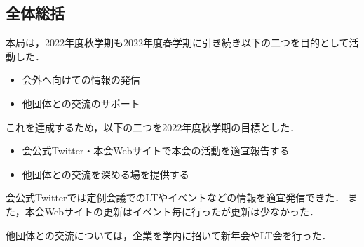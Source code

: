 \subsection*{全体総括}


本局は，2022年度秋学期も2022年度春学期に引き続き以下の二つを目的として活動した．
\begin{itemize}
    \item 会外へ向けての情報の発信
    \item 他団体との交流のサポート
\end{itemize}
これを達成するため，以下の二つを2022年度秋学期の目標とした．
\begin{itemize}
    \item 会公式Twitter・本会Webサイトで本会の活動を適宜報告する
    \item 他団体との交流を深める場を提供する
\end{itemize}

会公式Twitterでは定例会議でのLTやイベントなどの情報を適宜発信できた．
また，本会Webサイトの更新はイベント毎に行ったが更新は少なかった．

他団体との交流については，企業を学内に招いて新年会やLT会を行った．
